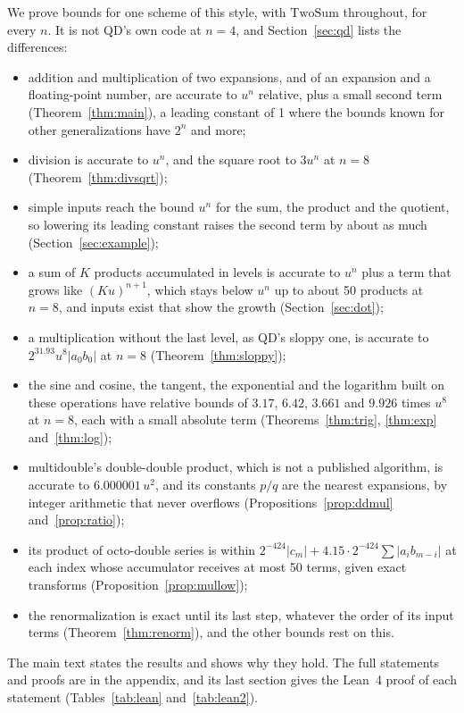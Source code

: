 \documentclass[conference]{IEEEtran}
\theoremstyle{definition}
\theoremstyle{remark}
\newcommand{\TwoSum}{\mathrm{TwoSum}}
\begin{document}
\begin{samepage}
We prove bounds for one scheme of this style, with $\TwoSum$ throughout, for every $n$. It is not QD's own code at
$n = 4$, and Section~\ref{sec:qd} lists the differences:
\begin{itemize}
\item addition and multiplication of two expansions, and of an expansion and a floating-point number, are accurate to
  $u^n$ relative, plus a small second term (Theorem~\ref{thm:main}), a leading constant of 1 where the bounds known
  for other generalizations have $2^n$ and more;
\item division is accurate to $u^n$, and the square root to $3u^n$ at $n = 8$ (Theorem~\ref{thm:divsqrt});
\item simple inputs reach the bound $u^n$ for the sum, the product and the quotient, so lowering its leading
  constant raises the second term by about as much (Section~\ref{sec:example});
\item a sum of $K$ products accumulated in levels is accurate to $u^n$ plus a term that grows like $(Ku)^{n+1}$, which
  stays below $u^n$ up to about 50 products at $n = 8$, and inputs exist that show the growth (Section~\ref{sec:dot});
\item a multiplication without the last level, as QD's sloppy one, is accurate to $2^{31.93}u^8|a_0b_0|$ at $n = 8$
  (Theorem~\ref{thm:sloppy});
\item the sine and cosine, the tangent, the exponential and the logarithm built on these operations have relative
  bounds of $3.17$, $6.42$, $3.661$ and $9.926$ times $u^8$ at $n = 8$, each with a small absolute term
  (Theorems~\ref{thm:trig}, \ref{thm:exp} and~\ref{thm:log});
\item multidouble's double-double product, which is not a published algorithm, is accurate to $6.000001\,u^2$,
  and its constants $p/q$ are the nearest expansions, by integer arithmetic that never overflows
  (Propositions~\ref{prop:ddmul} and~\ref{prop:ratio});
\item its product of octo-double series is within $2^{-424}|c_m| + 4.15 \cdot 2^{-424}\sum|a_ib_{m-i}|$ at each
  index whose accumulator receives at most 50 terms, given exact transforms (Proposition~\ref{prop:mullow});
\item the renormalization is exact until its last step, whatever the order of its input terms
  (Theorem~\ref{thm:renorm}), and the other bounds rest on this.
\end{itemize}
\end{samepage}
The main text states the results and shows why they hold. The full statements and proofs are in the appendix, and
its last section gives the Lean~4 proof of each statement (Tables~\ref{tab:lean} and~\ref{tab:lean2}).
\end{document}
